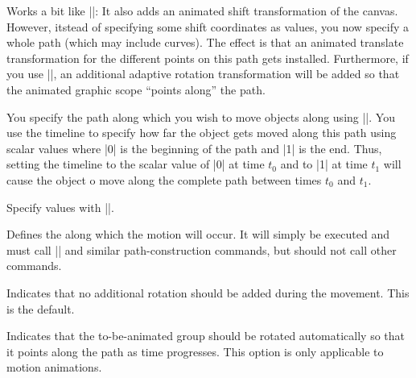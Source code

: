 \begin{command}{\pgfsys@animatemotion}
  Works a bit like |\pgfsys@animation@translate|: It also adds an
  animated shift transformation of the canvas. However, itstead of
  specifying some shift coordinates as values, you now specify a whole
  path (which may include curves). The effect is that an animated
  translate transformation for the different points on this path gets
  installed. Furthermore, if you use |\pgfsys@animation@rotatealong|, an
  additional adaptive rotation transformation will be added so that
  the animated graphic scope ``points along'' the path.

  You specify the path along which you wish to move objects along
  using |\pgfsys@animation@movealong|. You use the timeline to specify
  how far the object gets moved along this path using scalar values
  where |0| is the beginning of the path and |1| is the end. Thus,
  setting the timeline to the scalar value of |0| at time $t_0$ and to
  |1| at time $t_1$ will cause the object o move along the complete
  path between times $t_0$ and $t_1$.
  
  Specify values with |\pgfsys@animation@scalar|.
    
  \begin{command}{\pgfsys@animation@movealong{}}
    Defines the  along which the motion will occur. It will
    simply be executed and must call |\pgfsys@lineto| and similar
    path-construction commands, but should not call other commands.
\begin{codeexample}[width=2cm]
\end{codeexample}
  \end{command}

  \begin{command}{\pgfsys@animation@norotatealong}
    Indicates that no additional rotation should be added during the
    movement. This is the default.
  \end{command}
  
  \begin{command}{\pgfsys@animation@rotatealong}
    Indicates that the to-be-animated group should be rotated
    automatically so that it points along the path as time
    progresses. This option is only applicable to motion animations.
\begin{codeexample}[width=2cm]
\end{codeexample}
  \end{command}

\end{command}


